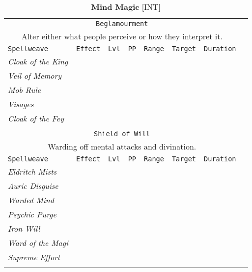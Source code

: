 \documentclass[10pt,a4paper]{article}
\begin{document}
\newpage
\begin{table}[htbp!]
\caption*{\textbf{\Large{Mind Magic}} [INT]}
\begin{tabular}{llllllll}
   \multicolumn{7}{c}{\texttt{Beglamourment}}\\
  \multicolumn{7}{c}{Alter either what people perceive or how they interpret it.}\\
    \hline
 \texttt{Spellweave} & \texttt{Effect} & \texttt{Lvl} & \texttt{PP} & \texttt{Range} & \texttt{Target} & \texttt{Duration} \\
    \hline
    \multirow{1}{*}{\textit{Cloak of the King}}&  & &&  &  & \\
    \hline
    \multirow{1}{*}{\textit{Veil of Memory}}&  & &&  &  & \\
    \hline
    \multirow{1}{*}{\textit{Mob Rule}}&  & &&  &  & \\
    \hline
    \multirow{1}{*}{\textit{Visages}}&  & &&  &  & \\
    \hline
    \multirow{1}{*}{\textit{Cloak of the Fey}}&  & &&  &  & \\
	&&&&&&\\	
	
	
    	
  \multicolumn{7}{c}{\texttt{Shield of Will}}\\
  \multicolumn{7}{c}{Warding off mental attacks and divination.}\\
    \hline
 \texttt{Spellweave} & \texttt{Effect} & \texttt{Lvl} & \texttt{PP} & \texttt{Range} & \texttt{Target} & \texttt{Duration} \\
    \hline
    \multirow{1}{*}{\textit{Eldritch Mists}}&  & &&  &  & \\
    \hline
    \multirow{1}{*}{\textit{Auric Disguise}}&  & &&  &  & \\
    \hline
    \multirow{1}{*}{\textit{Warded Mind}}&  & &&  &  & \\
    \hline
    \multirow{1}{*}{\textit{Psychic Purge}}&  & &&  &  & \\
    \hline
    \multirow{1}{*}{\textit{Iron Will}}&  & &&  &  & \\
    \hline
    \multirow{1}{*}{\textit{Ward of the Magi}}&  & &&  &  & \\
    \hline
    \multirow{1}{*}{\textit{Supreme Effort}}&  & &&  &  & \\    
	&&&&&&\\
	
	
	

\end{tabular}
\end{table}
\end{document}

